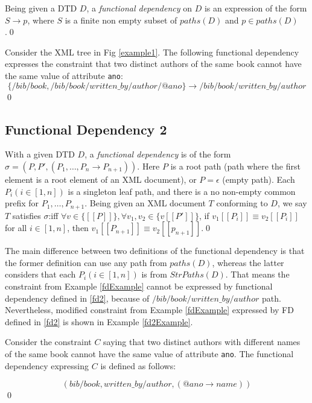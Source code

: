 \begin{define}\label{fd1}
Being given a DTD $D$, a {\sl functional dependency} on $D$ is an expression of the form $S \rightarrow p$, where $S$ is a finite non empty subset of $paths(D)$ and $p \in paths(D)$.\qed
\end{define}

\begin{example}\label{fdExample}
Consider the XML tree in Fig \ref{example1}. The following functional dependency expresses the constraint that two distinct authors of the same book cannot have the same value of attribute \texttt{ano}:$$\{/bib/book, /bib/book/written\_by/author/@ano\} \rightarrow /bib/book/written\_by/author$$\qed
\end{example}

\subsection{Functional Dependency 2}

\begin{define}\label{fd2}
With a given DTD $D$, a {\sl functional dependency} is of the form $\sigma = (P, P', (P_1, \dots, P_n \rightarrow P_{n+1}))$. Here $P$ is a  root path (path where the first element is a root element of an XML document), or $P = \epsilon$ (empty path). Each $P_i (i \in [1,n])$ is a singleton leaf path, and there is a no non-empty common prefix for $P_1, \dots, P_{n+1}$. Being given an XML document $T$ conforming to $D$, we say $T$ satisfies $\sigma$:iff $\forall v \in \{[\![P]\!]\}, \forall v_1, v_2 \in \{v[\![P']\!]\}$, if $v_1[\![P_i]\!] \equiv v_2[\![P_i]\!]$ for all $i \in [1,n]$, then $v_1[\![P_{n+1}]\!] \equiv v_2[\![p_{n+1}]\!]$.\qed
\end{define}

The main difference between two definitions of the functional dependency is that the former definition can use any path from $paths(D)$, whereas the latter considers that each $P_i (i \in [1,n])$ is from $StrPaths(D)$. That means the constraint from Example \ref{fdExample} cannot be expressed by functional dependency defined in \ref{fd2}, because of $/bib/book/written\_by/author$ path. Nevertheless, modified constraint from Example \ref{fdExample} expressed by FD defined in \ref{fd2} is shown in Example \ref{fd2Example}.

\begin{example}\label{fd2Example}
Consider the constraint $C$ saying that two distinct authors with different names of the same book cannot have the same value of attribute \texttt{ano}. The functional dependency expressing $C$ is defined as follows:

$$(bib/book, written\_by/author, (@ano \rightarrow name))$$\qed
\end{example}
